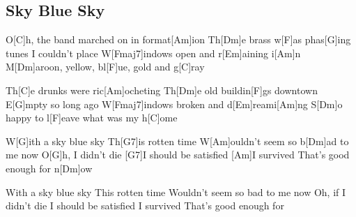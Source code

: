 \subsection*{Sky Blue Sky   }
\begin{guitar}
O[C]h, the band marched on in format[Am]ion
Th[Dm]e brass w[F]as phas[G]ing tunes I couldn’t place
W[Fmaj7]indows open and r[Em]aining i[Am]n
M[Dm]aroon, yellow, bl[F]ue, gold and g[C]ray



Th[C]e drunks were ric[Am]ocheting
Th[Dm]e old buildin[F]gs downtown
E[G]mpty so long ago
W[Fmaj7]indows broken and d[Em]reami[Am]ng
S[Dm]o happy to l[F]eave what was my h[C]ome



W[G]ith a sky blue sky
Th[G7]is rotten time
W[Am]ouldn’t seem so b[Dm]ad to me now
O[G]h, I didn’t die
[G7]I should be satisfied
[Am]I survived
That's good enough for n[Dm]ow



With a sky blue sky
This rotten time
Wouldn’t seem so bad to me now
Oh, if I didn’t die
I should be satisfied
I survived
That's good enough for 
\end{guitar}
